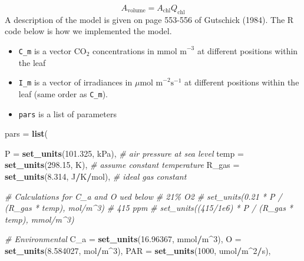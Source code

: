 \documentclass[12pt,halfline,a4paper,]{ouparticle}
\newenvironment{Shaded}{\begin{snugshade}}{\end{snugshade}}
\newcommand{\AttributeTok}[1]{\textcolor[rgb]{0.13,0.29,0.53}{#1}}
\newcommand{\CommentTok}[1]{\textcolor[rgb]{0.56,0.35,0.01}{\textit{#1}}}
\newcommand{\DecValTok}[1]{\textcolor[rgb]{0.00,0.00,0.81}{#1}}
\newcommand{\FloatTok}[1]{\textcolor[rgb]{0.00,0.00,0.81}{#1}}
\newcommand{\FunctionTok}[1]{\textcolor[rgb]{0.13,0.29,0.53}{\textbf{#1}}}
\newcommand{\NormalTok}[1]{#1}
\newcommand{\OtherTok}[1]{\textcolor[rgb]{0.56,0.35,0.01}{#1}}
\newcommand{\SpecialCharTok}[1]{\textcolor[rgb]{0.81,0.36,0.00}{\textbf{#1}}}
\providecommand{\tightlist}{%
  \setlength{\itemsep}{0pt}\setlength{\parskip}{0pt}}
\begin{document}
\[A_\text{volume} = A_\text{chl} Q_\text{chl}\] A description of the
model is given on page 553-556 of Gutschick (1984). The R code below is
how we implemented the model.

\begin{itemize}
\tightlist
\item
  \texttt{C\_m} is a vector CO\(_2\) concentrations in
  \(\text{mmol m}^{-3}\) at different positions within the leaf
\item
  \texttt{I\_m} is a vector of irradiances in
  \(\mu \text{mol m}^{-2} \text{s}^{-1}\) at different positions within
  the leaf (same order as \texttt{C\_m}).
\item
  \texttt{pars} is a list of parameters
\end{itemize}

\begin{Shaded}
\begin{Highlighting}[]
\NormalTok{pars }\OtherTok{=} \FunctionTok{list}\NormalTok{(}

    \AttributeTok{P =} \FunctionTok{set\_units}\NormalTok{(}\FloatTok{101.325}\NormalTok{, kPa), }\CommentTok{\# air pressure at sea level}
    \AttributeTok{temp =} \FunctionTok{set\_units}\NormalTok{(}\FloatTok{298.15}\NormalTok{, K), }\CommentTok{\# assume constant temperature}
    \AttributeTok{R\_gas =} \FunctionTok{set\_units}\NormalTok{(}\FloatTok{8.314}\NormalTok{, J}\SpecialCharTok{/}\NormalTok{K}\SpecialCharTok{/}\NormalTok{mol), }\CommentTok{\# ideal gas constant}

    \CommentTok{\# Calculations for C\_a and O ued below}
    \CommentTok{\# 21\% O2}
    \CommentTok{\# set\_units(0.21 * P / (R\_gas * temp), mol/m\^{}3)}
    \CommentTok{\# 415 ppm}
    \CommentTok{\# set\_units((415/1e6) * P / (R\_gas * temp), mmol/m\^{}3)}

    \CommentTok{\# Environmental}
    \AttributeTok{C\_a =} \FunctionTok{set\_units}\NormalTok{(}\FloatTok{16.96367}\NormalTok{, mmol}\SpecialCharTok{/}\NormalTok{m}\SpecialCharTok{\^{}}\DecValTok{3}\NormalTok{),}
    \AttributeTok{O =} \FunctionTok{set\_units}\NormalTok{(}\FloatTok{8.584027}\NormalTok{, mol}\SpecialCharTok{/}\NormalTok{m}\SpecialCharTok{\^{}}\DecValTok{3}\NormalTok{),}
    \AttributeTok{PAR =} \FunctionTok{set\_units}\NormalTok{(}\DecValTok{1000}\NormalTok{, umol}\SpecialCharTok{/}\NormalTok{m}\SpecialCharTok{\^{}}\DecValTok{2}\SpecialCharTok{/}\NormalTok{s),}


\end{Highlighting}
\end{Shaded}
\end{document}
